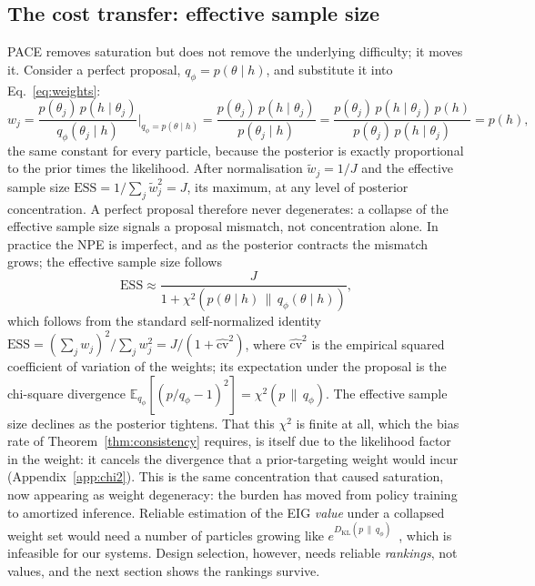 \subsection{The cost transfer: effective sample size}
\label{sec:m-costtransfer}

PACE removes saturation but does not remove the underlying difficulty; it moves it.
Consider a perfect proposal, $q_\phi=p(\theta\mid h)$, and substitute it into
Eq.~\eqref{eq:weights}:
\begin{equation}
\label{eq:widentity}
w_j = \frac{p(\theta_j)\,p(h\mid\theta_j)}{q_\phi(\theta_j\mid h)}\bigg|_{q_\phi=p(\theta\mid h)}
= \frac{p(\theta_j)\,p(h\mid\theta_j)}{p(\theta_j\mid h)}
= \frac{p(\theta_j)\,p(h\mid\theta_j)\,p(h)}{p(\theta_j)\,p(h\mid\theta_j)} = p(h),
\end{equation}
the same constant for every particle, because the posterior is exactly proportional to
the prior times the likelihood. After normalisation $\tilde w_j=1/J$ and the effective
sample size $\mathrm{ESS}=1/\sum_j\tilde w_j^2=J$, its maximum, at any level of
posterior concentration. A perfect proposal therefore never degenerates: a collapse
of the effective sample size signals a proposal mismatch, not concentration alone. In
practice the NPE is imperfect, and as the posterior contracts the mismatch grows; the
effective sample size follows
\begin{equation}
\label{eq:ess}
\mathrm{ESS}\approx\frac{J}{1+\chi^2(p(\theta\mid h)\,\|\,q_\phi(\theta\mid h))},
\end{equation}
which follows from the standard self-normalized identity
$\mathrm{ESS}=(\sum_j w_j)^2/\sum_j w_j^2=J/(1+\widehat{\mathrm{cv}}^2)$, where
$\widehat{\mathrm{cv}}^2$ is the empirical squared coefficient of variation of the weights;
its expectation under the proposal is the chi-square divergence
$\mathbb{E}_{q_\phi}[(p/q_\phi-1)^2]=\chi^2(p\,\|\,q_\phi)$. The effective sample size
declines as the posterior tightens. That this $\chi^2$ is finite at all, which the
bias rate of Theorem~\ref{thm:consistency} requires, is itself due to the likelihood
factor in the weight: it cancels the divergence that a prior-targeting weight would
incur (Appendix~\ref{app:chi2}). This is the same concentration that caused saturation,
now appearing as weight degeneracy: the burden has moved from policy training to
amortized inference. Reliable estimation of the EIG \emph{value} under a
collapsed weight set would need a number of particles growing like
$e^{D_{\mathrm{KL}}(p\,\|\,q_\phi)}$~\citep{chatterjee2018sample}, which is infeasible
for our systems. Design selection, however, needs reliable \emph{rankings}, not
values, and the next section shows the rankings survive.

